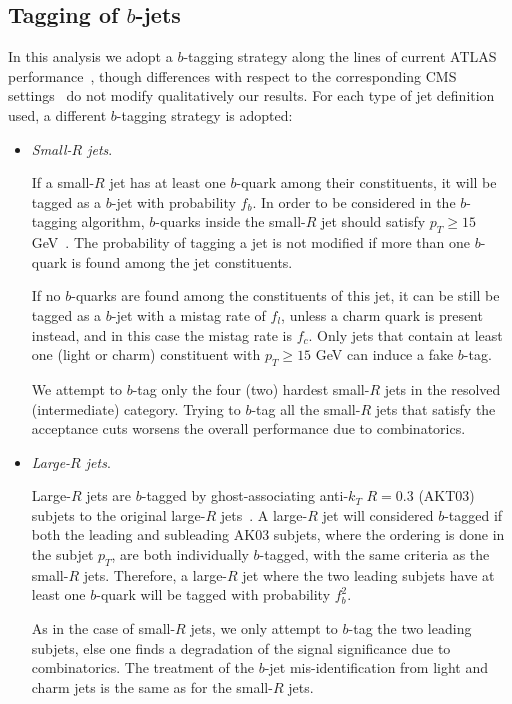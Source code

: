 


\subsection{Tagging of $b$-jets}
\label{sec:btagging}

In this analysis we adopt
a $b$-tagging strategy along the lines
of current ATLAS performance~\cite{Aad:2013gja,Aad:2015ydr},
though differences with respect to
the corresponding CMS
settings~\cite{Khachatryan:2011wq,Chatrchyan:2012jua}
do not modify qualitatively our results.
%
For each type of jet definition used, a different
$b$-tagging strategy is adopted:

\begin{itemize}

\item {\it Small-$R$ jets}.

  If a small-$R$ jet has at least one $b$-quark among their constituents,
  it will be tagged as a $b$-jet with probability $f_b$.
  In order to be considered in the $b$-tagging algorithm,
  $b$-quarks inside the small-$R$ jet
  should satisfy $p_T \ge 15$ GeV~\cite{Aad:2015ydr}.
  The probability of tagging a jet is not modified
  if more than one $b$-quark is found among the jet constituents.


  
  If no $b$-quarks are found among the constituents
  of this jet, it can be still be tagged as a $b$-jet with
  a mistag rate of $f_l$, unless a charm quark is present instead,
  and in this case the mistag rate is $f_c$.
  Only jets that contain at least one (light or charm)
  constituent
  with $p_T \ge 15$ GeV can induce a fake $b$-tag.

  
  We attempt to $b$-tag only the four (two) hardest small-$R$ jets
  in the resolved (intermediate) category.
  Trying to $b$-tag all the
  small-$R$ jets that satisfy the acceptance cuts worsens the
  overall performance
  due to combinatorics.

  \item {\it Large-$R$ jets}.

    Large-$R$ jets are $b$-tagged by
    ghost-associating anti-$k_T$ $R=0.3$ (AKT03)
    subjets to the original large-$R$
    jets~\cite{Cacciari:2007fd,Aad:2013gja,
      ATLAS-CONF-2014-004,Aad:2015uka}.
    A large-$R$ jet will considered $b$-tagged if both
    the leading and subleading AK03 subjets, where the ordering
    is done in the subjet $p_T$, are both individually $b$-tagged,
    with the same criteria as the small-$R$ jets.
     Therefore, a large-$R$ jet where the two leading
    subjets have at least one $b$-quark will be tagged
    with probability $f_b^2$.
    
    As in the case
    of small-$R$ jets, we only attempt to $b$-tag the two leading subjets,
    else one finds a degradation of the
    signal significance due to combinatorics.
    The treatment of the $b$-jet mis-identification
    from light and charm jets
    is the same as for the small-$R$ jets.
  
\end{itemize}

